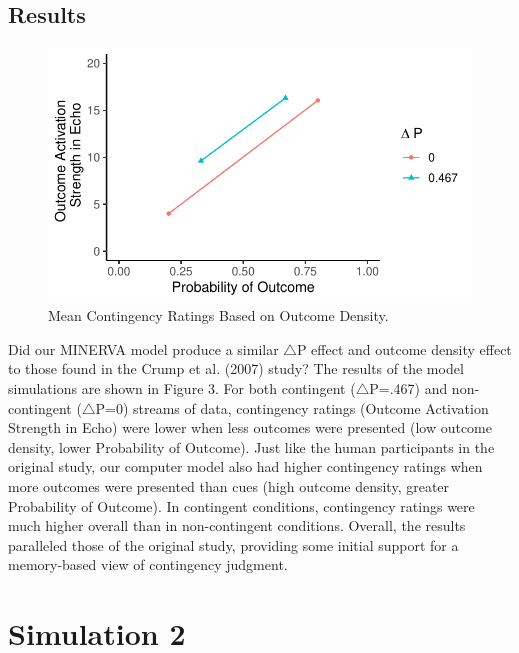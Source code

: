 \documentclass[
  english,
  man,floatsintext]{apa6}
\begin{document}
\hypertarget{results}{%
\subsection{Results}\label{results}}

\begin{figure}

{\centering \includegraphics{Thesis_google_test_files/figure-latex/unnamed-chunk-5-1} 

}

\caption{Mean Contingency Ratings Based on Outcome Density.}\label{fig:unnamed-chunk-5}
\end{figure}

Did our MINERVA model produce a similar \(\triangle\)P effect and outcome density effect to those found in the Crump et al. (2007) study? The results of the model simulations are shown in Figure 3. For both contingent (\(\triangle\)P=.467) and non-contingent (\(\triangle\)P=0) streams of data, contingency ratings (Outcome Activation Strength in Echo) were lower when less outcomes were presented (low outcome density, lower Probability of Outcome). Just like the human participants in the original study, our computer model also had higher contingency ratings when more outcomes were presented than cues (high outcome density, greater Probability of Outcome). In contingent conditions, contingency ratings were much higher overall than in non-contingent conditions. Overall, the results paralleled those of the original study, providing some initial support for a memory-based view of contingency judgment.

\hypertarget{simulation-2}{%
\section{Simulation 2}\label{simulation-2}}
\end{document}
